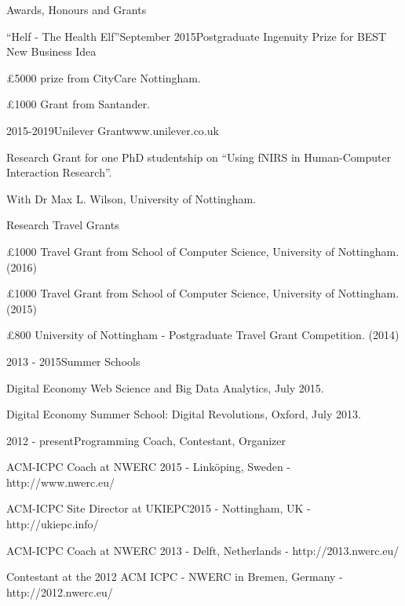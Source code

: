 \documentclass{resume} %
\begin{document}
\begin{rSection}{Awards, Honours and Grants}
    \begin{rSubsection}{``Helf - The Health Elf''}{September 2015}{Postgraduate Ingenuity Prize for BEST New Business Idea}{}
        \item \pounds 5000 prize from CityCare Nottingham.
        \item \pounds 1000 Grant from Santander.
    \end{rSubsection}
\vspace{-4 mm}
    \begin{rSubsection}{\vspace{-2 mm}}{2015-2019}{Unilever Grant}{www.unilever.co.uk}
        \item Research Grant for one PhD studentship on ``Using fNIRS in Human-Computer Interaction Research''.
        \item With Dr Max L. Wilson, University of Nottingham.
    \end{rSubsection}
\vspace{-4 mm}
    \begin{rSubsection}{}{}{Research Travel Grants}{}
        \item \pounds 1000 Travel Grant from School of Computer Science, University of Nottingham. (2016)
        \item \pounds 1000 Travel Grant from School of Computer Science, University of Nottingham. (2015)
        \item \pounds 800 University of Nottingham - Postgraduate Travel Grant Competition. (2014)
    \end{rSubsection}
\vspace{-2 mm}
    \begin{rSubsection}{}{2013 - 2015}{Summer Schools}{}
        \item Digital Economy Web Science and Big Data Analytics, July 2015.
        \item Digital Economy Summer School: Digital Revolutions, Oxford, July 2013.
    \end{rSubsection}
\vspace{-2 mm}
    \begin{rSubsection}{}{2012 - present}{Programming Coach, Contestant, Organizer}{}
        \item  ACM-ICPC Coach at NWERC 2015 - Linköping, Sweden - {http://www.nwerc.eu/}
        \item  ACM-ICPC Site Director at UKIEPC2015 - Nottingham, UK - {http://ukiepc.info/}
        \item  ACM-ICPC Coach at NWERC 2013 - Delft, Netherlands  - {http://2013.nwerc.eu/}
        \item Contestant at the 2012 ACM ICPC - NWERC in Bremen, Germany - {http://2012.nwerc.eu/}

    \end{rSubsection}

\end{rSection}
\end{document}

